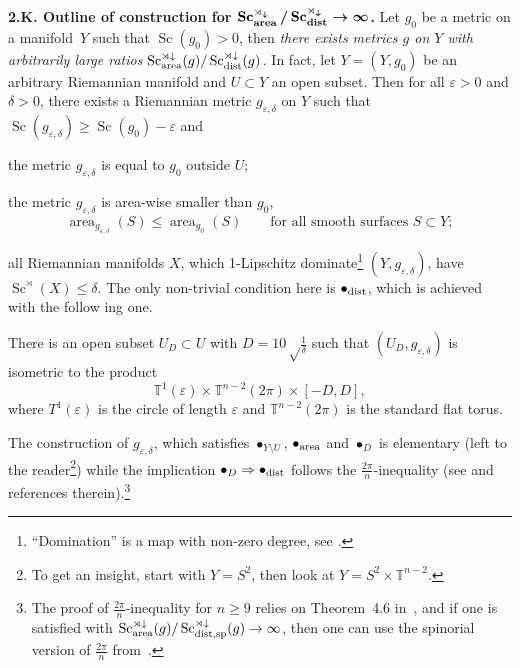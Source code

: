 \documentclass[pdftex]{sigma}
\numberwithin{equation}{section}
\begin{document}
\textbf{2.K. Outline of construction for $\boldsymbol{\operatorname{Sc}^{\rtimes_\downarrow}_{\rm area}/\operatorname{Sc}_{\rm dist}^{\rtimes_\downarrow}\to\infty}$.}
Let $g_0$ be a metric on a manifold~$Y$ such that $\operatorname{Sc}(g_0)>0$, then
{\it there exists metrics $g$ on $Y$ with arbitrarily large ratios $\operatorname{Sc}^{\rtimes\downarrow}_{\rm area}(g)/\operatorname{Sc}_{\rm dist}^{\rtimes\downarrow}(g)$.}
In fact, let $Y=(Y,g_0) $ be an arbitrary Riemannian manifold and $U\subset Y$ an open subset.
Then
for all $\varepsilon >0$ and $\delta>0$, there exists a Riemannian metric $g_{\varepsilon, \delta}$ on $Y$
 such that $ \operatorname{Sc}( g_{\varepsilon, \delta})\geq \operatorname{Sc}(g_0)-\varepsilon$ and
\begin{description}\itemsep=0pt\setlength{\leftskip}{0.50cm}
\item[$\bullet_{Y\setminus U}$] the metric $g_{\varepsilon, \delta}$ is equal to $g_0$ outside $U$;
\item[$\bullet_{\rm area}$] the metric $g_{\varepsilon, \delta}$ is area-wise smaller than $g_0$,
\[
\operatorname{area}_{g_{\varepsilon, \delta}}(S)\leq \operatorname{area}_{g_0}(S)\qquad \text{for all smooth surfaces $S\subset Y$};
\]
\item[$\bullet_{\rm dist}$] all Riemannian manifolds $X$, which 1-Lipschitz dominate\footnote{``Domination'' is a map with non-zero degree, see  \cite[\S1.5]{Gr2021}.}
 $(Y,g_{\varepsilon, \delta})$, have
$\operatorname{Sc}^\rtimes (X)\leq \delta$.
The only non-trivial condition here is $\bullet_{\rm dist}$, which is achieved with the follow ing
 one.
\item[$\bullet_{D}$] There is an open subset $U_D\subset U $ with $D=10\sqrt \frac {1}{\delta}$ such that
$(U_D, g_{\varepsilon, \delta})$ is isometric to the product
\[
\mathbb T^1(\varepsilon)\times \mathbb T^{n-2}(2\pi) \times [-D,D],
\]
where $T^1(\varepsilon)$ is the circle of length $\varepsilon$ and $\mathbb T^{n-2}(2\pi)$ is the standard flat torus.
\end{description}

The construction of $g_{\varepsilon, \delta}$, which satisfies $\bullet_{Y\setminus U}$,
$\bullet_{\rm area}$ and $\bullet_{D}$ is elementary (left to the reader\footnote{To get an insight, start with
$Y=S^2$, then look at $Y=S^2\times \mathbb T^{n-2}$.})
while the implication $\bullet_{D}\Rightarrow \bullet_{\rm dist}$ follows
the $\frac{2\pi}{n}$-inequality (see \cite[\S3.6]{Gr2021} and references therein).\footnote{The proof of $\frac{2\pi}{n}$-inequality for $n\geq 9$
relies on Theorem~4.6 in~\cite{SY2017}, and if one is satisfied with
$\operatorname{Sc}^{\rtimes\downarrow}_{\rm area}(g)/\operatorname{Sc}_{{\rm dist,sp}}^{\rtimes\downarrow}(g)\to \infty$, then one can use the spinorial version of
$\frac{2\pi}{n}$ from~\cite{Ze2019}.}
\end{document}
